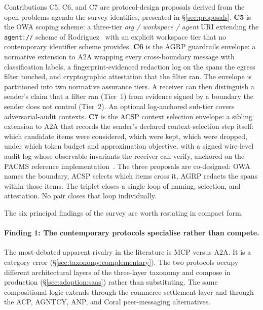 Contributions C5, C6, and C7 are protocol-design
proposals derived from the open-problems agenda the
survey identifies, presented in \S\ref{sec:proposals}.
\textbf{C5} is the OWA scoping scheme: a three-tier
\emph{org / workspace / agent} URI extending the
\texttt{agent://} scheme of
Rodriguez~\cite{agent_uri_scheme} with an explicit workspace
tier that no contemporary identifier scheme provides.
\textbf{C6} is the AGRP guardrails envelope: a normative
extension to A2A wrapping every cross-boundary message
with classification labels, a fingerprint-evidenced
redaction log on the spans the egress filter touched,
and cryptographic attestation that the filter ran.
The envelope is partitioned into two normative assurance
tiers. A receiver can then distinguish a sender's claim
that a filter ran (Tier~1) from evidence signed by a
boundary the sender does not control (Tier~2). An
optional log-anchored sub-tier covers adversarial-audit
contexts.
\textbf{C7} is the ACSP context selection envelope: a
sibling extension to A2A that records the sender's
declared context-selection step itself: which candidate
items were considered, which were kept, which were
dropped, under which token budget and approximation
objective, with a signed wire-level audit log whose
observable invariants the receiver can verify, anchored on the PACMS reference
implementation~\cite{pacms_cikm_demo}. The three
proposals are co-designed: OWA names the boundary, ACSP
selects which items cross it, AGRP redacts the spans
within those items. The triplet closes a single loop of
naming, selection, and attestation. No pair
closes that loop individually.

The six principal findings of the survey are
worth restating in compact form.

\paragraph{Finding 1: The contemporary protocols
specialise rather than compete.}
The most-debated apparent rivalry in the literature
is MCP versus A2A. It is a category error
(\S\ref{sec:taxonomy:complementary}). The two
protocols occupy different architectural layers of
the three-layer taxonomy and compose in production
(\S\ref{sec:adoption:saas}) rather than
substituting. The same compositional logic extends
through the commerce-settlement layer and through
the ACP, AGNTCY, ANP, and Coral peer-messaging
alternatives.

